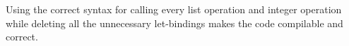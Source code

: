 Using the correct syntax for calling every list operation and integer operation while deleting all the unnecessary let-bindings makes the
code compilable and correct.









